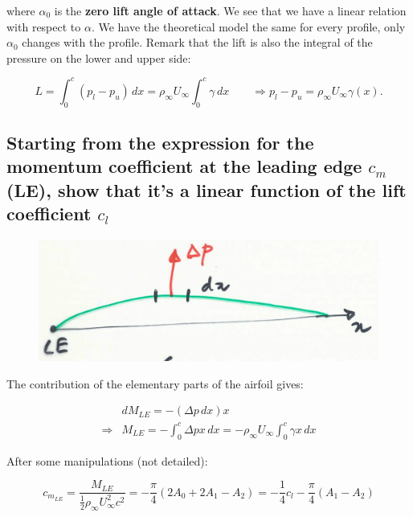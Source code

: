 \documentclass[british,french,11pt, a4paper, openany]{article}
\begin{document}
where $\alpha _0$ is the \textbf{zero lift angle of attack}. We see that we have a linear relation with respect to $\alpha$. We have the theoretical model the same for every profile, only $\alpha _0$ changes with the profile. Remark that the lift is also the integral of the pressure on the lower and upper side:

\begin{equation}
L = \int _0 ^c (p_l - p_u) \, dx = \rho _\infty U_\infty \int _0 ^c \gamma \, dx \qquad \Rightarrow p_l - p_u = \rho _\infty U_\infty \gamma (x).
\end{equation}

\subsection{Starting from the expression for the momentum coefficient at the leading edge $c_m$(LE), show that it’s a linear function of the lift coefficient $c_l$}


\begin{figure}
	\vspace{-5mm}
	\includegraphics[scale=0.1]{ch2/34}
\end{figure}
The contribution of the elementary parts of the airfoil gives:

\begin{equation}
\begin{aligned}
&dM_{LE} = - (\Delta p \, dx) x \\ 
\Rightarrow &M_{LE} = -\int _0 ^c \Delta p x \, dx = - \rho _\infty U_\infty \int _0^c \gamma x \, dx
\end{aligned}
\end{equation}

After some manipulations (not detailed):

\begin{equation}
c_{m_{LE}} = \frac{M_{LE}}{\frac{1}{2}\rho _\infty U_\infty ^2 c^2} = - \frac{\pi}{4} (2A_0 + 2A_1 - A_2) = -\frac{1}{4} c_l - \frac{\pi}{4} (A_1 - A_2)
\end{equation}
\end{document}
